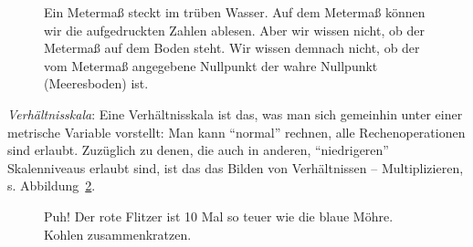\documentclass[
  a4paper,
]{scrbook}
\theoremstyle{definition}
\theoremstyle{definition}
\theoremstyle{definition}
\theoremstyle{remark}
\begin{document}
\begin{figure}


\caption{\label{fig-intervall}Ein Metermaß steckt im trüben Wasser. Auf
dem Metermaß können wir die aufgedruckten Zahlen ablesen. Aber wir
wissen nicht, ob der Metermaß auf dem Boden steht. Wir wissen demnach
nicht, ob der vom Metermaß angegebene Nullpunkt der wahre Nullpunkt
(Meeresboden) ist.}

\end{figure}%

\emph{Verhältnisskala}: Eine Verhältnisskala ist das, was man sich
gemeinhin unter einer metrische Variable vorstellt: Man kann ``normal''
rechnen, alle Rechenoperationen sind erlaubt. Zuzüglich zu denen, die
auch in anderen, ``niedrigeren'' Skalenniveaus erlaubt sind, ist das das
Bilden von Verhältnissen -- Multiplizieren, s.
Abbildung~\ref{fig-verhaeltnis}.

\begin{figure}


\caption{\label{fig-verhaeltnis}Puh! Der rote Flitzer ist 10 Mal so
teuer wie die blaue Möhre. Kohlen zusammenkratzen.}

\end{figure}%
\end{document}
